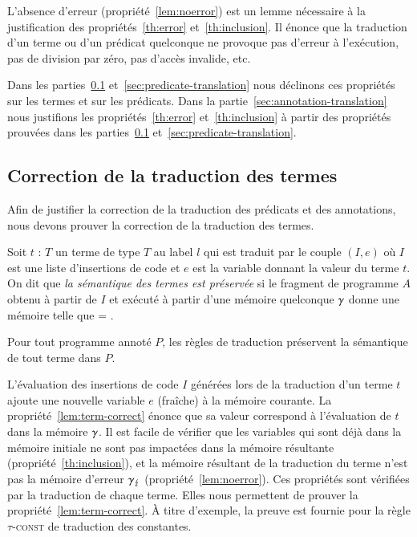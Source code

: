 L'absence d'erreur (propriété~\ref{lem:noerror}) est un lemme nécessaire à la
justification des propriétés~\ref{th:error} et~\ref{th:inclusion}.
Il énonce que la traduction d'un terme ou d'un prédicat \eacsl quelconque ne
provoque pas d'erreur à l'exécution, pas de division par zéro, pas d'accès
invalide, etc.

Dans les parties~\ref{sec:term-translation} et~\ref{sec:predicate-translation}
nous déclinons ces propriétés sur les termes et sur les prédicats.
Dans la partie~\ref{sec:annotation-translation} nous justifions les
propriétés~\ref{th:error} et~\ref{th:inclusion} à partir des propriétés prouvées
dans les parties~\ref{sec:term-translation} et~\ref{sec:predicate-translation}.


\subsection{Correction de la traduction des termes}
\label{sec:term-translation}


Afin de justifier la correction de la traduction des prédicats et des
annotations, nous devons prouver la correction de la traduction des termes.

\begin{definition}
  \label{def:term-correct}
  Soit $t$ : $T$ un terme de type $T$ au label $l$ qui est traduit par le couple
  $(I, e)$ où $I$ est une liste d'insertions de code et $e$ est la variable
  donnant la valeur du terme $t$.
  On dit que \emph{la sémantique des termes est préservée} si le fragment de
  programme $A$ obtenu   à partir de $I$ et exécuté à partir d'une mémoire
  quelconque $\gamma$ donne une mémoire  telle que
   = .
\end{definition}

\begin{myproperty}
  \label{lem:term-correct}
  Pour tout programme annoté $P$, les règles de traduction préservent la
  sémantique de tout terme \eacsl dans $P$.
\end{myproperty}

L'évaluation des insertions de code $I$ générées lors de la traduction d'un
terme $t$ ajoute une nouvelle variable $e$ (fraîche) à la mémoire courante.
La propriété~\ref{lem:term-correct} énonce que sa valeur correspond à
l'évaluation de $t$ dans la mémoire $\gamma$.
Il est facile de vérifier que les variables qui sont déjà dans la mémoire
initiale ne sont pas impactées dans la mémoire résultante
(propriété~\ref{th:inclusion}), et la mémoire résultant de la traduction du
terme n'est pas la mémoire d'erreur $\gamma_\lightning$ (propriété~\ref{lem:noerror}).
Ces propriétés sont vérifiées par la traduction de chaque terme.
Elles nous permettent de prouver la propriété~\ref{lem:term-correct}.
À titre d'exemple, la preuve est fournie pour la règle \textsc{$\tau$-const} de
traduction des constantes.


